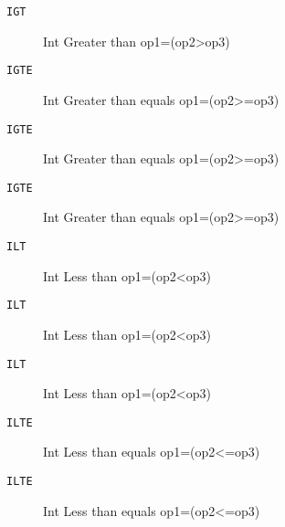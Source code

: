 
\begin{description}
\item[\texttt{IGT        }]  Int Greater than op1=(op2>op3)\\
\end{description}

\begin{description}
\item[\texttt{IGTE       }]  Int Greater than equals op1=(op2>=op3)\\
\end{description}

\begin{description}
\item[\texttt{IGTE       }]  Int Greater than equals op1=(op2>=op3)\\
\end{description}

\begin{description}
\item[\texttt{IGTE       }]  Int Greater than equals op1=(op2>=op3)\\
\end{description}

\begin{description}
\item[\texttt{ILT        }]  Int Less than op1=(op2<op3)\\
\end{description}

\begin{description}
\item[\texttt{ILT        }]  Int Less than op1=(op2<op3)\\
\end{description}

\begin{description}
\item[\texttt{ILT        }]  Int Less than op1=(op2<op3)\\
\end{description}

\begin{description}
\item[\texttt{ILTE       }]  Int Less than equals op1=(op2<=op3)\\
\end{description}

\begin{description}
\item[\texttt{ILTE       }]  Int Less than equals op1=(op2<=op3)\\
\end{description}

